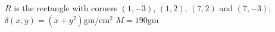 {$R$ is the rectangle with corners $(1,-3)$, $(1,2)$, $(7,2)$ and $(7,-3)$; $\delta(x,y) = (x+y^2)$gm/cm$^2$
}
{$M = 190$gm%
}